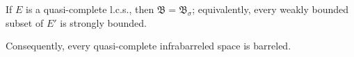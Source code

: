 If $E$ is a quasi-complete l.c.s., then $\mathfrak{B} = \mathfrak{B}_{\sigma}$; equivalently, every weakly bounded subset of $E'$ is strongly bounded.

Consequently, every quasi-complete infrabarreled space is barreled.
